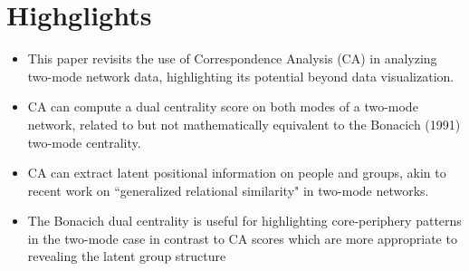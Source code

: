 \documentclass{article}
\begin{document}
\section*{Highglights}

\begin{itemize}
  \item This paper revisits the use of Correspondence Analysis (CA) in analyzing two-mode network data, highlighting its potential beyond data visualization.
  \item CA can compute a dual centrality score on both modes of a two-mode network, related to but not mathematically equivalent to the Bonacich (1991) two-mode centrality. 
  \item CA can extract latent positional information on people and groups, akin to recent work on ``generalized relational similarity" in two-mode networks. 
  \item The Bonacich dual centrality is useful for highlighting core-periphery patterns in the two-mode case in contrast to CA scores which are more appropriate to revealing the latent group structure 
\end{itemize}
\end{document}
